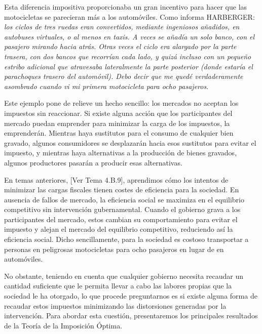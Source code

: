 \documentclass[10pt,a4paper]{article}
\newcommand{\authorfont}[1]{{\fontfamily{EBGaramond-TLF}\selectfont #1}}
\begin{document}
Esta diferencia impositiva proporcionaba un gran incentivo para hacer que las motocicletas se parecieran más a los automóviles. Como informa HARBERGER: \textit{los ciclos de tres ruedas eran convertidos, mediante ingeniosos añadidos, en autobuses virtuales, o al menos en taxis. A veces se añadía un solo banco, con el pasajero mirando hacia atrás. Otras veces el ciclo era alargado por la parte trasera, con dos bancos que recorrían cada lado, y quizá incluso con un pequeño estribo adicional que atravesaba lateralmente la parte posterior (donde estaría el parachoques trasero del automóvil). Debo decir que me quedé verdaderamente asombrado cuando vi mi primera motocicleta para ocho pasajeros}.

Este ejemplo pone de relieve un hecho sencillo: los mercados no aceptan los impuestos sin reaccionar. Si existe alguna acción que los participantes del mercado puedan emprender para minimizar la carga de los impuestos, la emprenderán. Mientras haya sustitutos para el consumo de cualquier bien gravado, algunos consumidores se desplazarán hacia esos sustitutos para evitar el impuesto, y mientras haya alternativas a la producción de bienes gravados, algunos productores pasarán a producir esas alternativas.

En temas anteriores, [\authorfont{Ver Tema 4.B.9}], aprendimos cómo los intentos de minimizar las cargas fiscales tienen costes de eficiencia para la sociedad. En ausencia de fallos de mercado, la eficiencia social se maximiza en el equilibrio competitivo sin intervención gubernamental. Cuando el gobierno grava a los participantes del mercado, estos cambian su comportamiento para evitar el impuesto y alejan el mercado del equilibrio competitivo, reduciendo así la eficiencia social. Dicho sencillamente, para la sociedad es costoso transportar a personas en peligrosas motocicletas para ocho pasajeros en lugar de en automóviles.

No obstante, teniendo en cuenta que cualquier gobierno necesita recaudar un cantidad suficiente que le permita llevar a cabo las labores propias que la sociedad le ha otorgado, lo que procede preguntarnos es si existe alguna forma de recaudar estos impuestos minimizando las distorsiones generadas por la intervención. Para abordar esta cuestión, presentaremos los principales resultados de la Teoría de la Imposición Óptima. 
\end{document}
